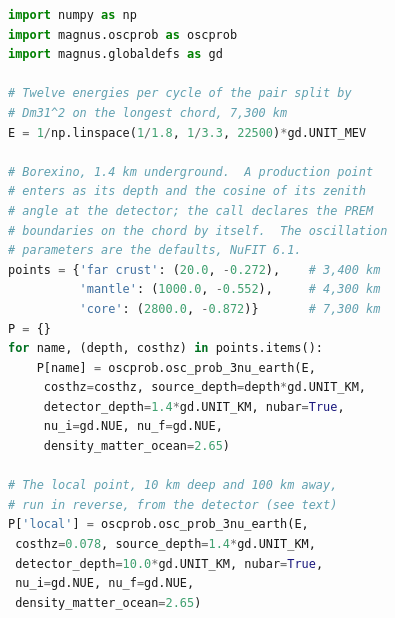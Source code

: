 \documentclass[final,5p,times,twocolumn,sort,compress]{elsarticle}
\makeatletter
\newcommand{\fig}{Fig.}
\DeclareRobustCommand{\_}{%
  \ifmmode\nfss@text{\textunderscore}\else\textunderscore\allowbreak\fi}
\newcommand{\figu}[1]{\fig~\ref{fig:#1}}
\makeatother
\begin{document}
\begin{lstlisting}[language=Python, caption={\textbf{Geoneutrino survival against energy.} The four panels of \figu{geoneutrino_energy}: the survival probability of a geoneutrino reaching Borexino from the far crust, the mantle, the base of the mantle, and the local crust, across the detectable window, on one energy grid fine enough to resolve the pair split by $\Delta m^2_{31}$ on the longest chord. The call declares the PREM boundaries on each chord by itself. The ocean layer of PREM is replaced by rock. The local production point is run in reverse, from the detector. See notebook \#28 and Sec.~\ref{sec:geoneutrinos} for details.}, label={lst:geoneutrinos}, float=tbp]
import numpy as np
import magnus.oscprob as oscprob
import magnus.globaldefs as gd

# Twelve energies per cycle of the pair split by
# Dm31^2 on the longest chord, 7,300 km
E = 1/np.linspace(1/1.8, 1/3.3, 22500)*gd.UNIT_MEV

# Borexino, 1.4 km underground.  A production point
# enters as its depth and the cosine of its zenith
# angle at the detector; the call declares the PREM
# boundaries on the chord by itself.  The oscillation
# parameters are the defaults, NuFIT 6.1.
points = {'far crust': (20.0, -0.272),    # 3,400 km
          'mantle': (1000.0, -0.552),     # 4,300 km
          'core': (2800.0, -0.872)}       # 7,300 km
P = {}
for name, (depth, costhz) in points.items():
    P[name] = oscprob.osc_prob_3nu_earth(E,
     costhz=costhz, source_depth=depth*gd.UNIT_KM,
     detector_depth=1.4*gd.UNIT_KM, nubar=True,
     nu_i=gd.NUE, nu_f=gd.NUE,
     density_matter_ocean=2.65)

# The local point, 10 km deep and 100 km away,
# run in reverse, from the detector (see text)
P['local'] = oscprob.osc_prob_3nu_earth(E,
 costhz=0.078, source_depth=1.4*gd.UNIT_KM,
 detector_depth=10.0*gd.UNIT_KM, nubar=True,
 nu_i=gd.NUE, nu_f=gd.NUE,
 density_matter_ocean=2.65)
\end{lstlisting}
\end{document}
